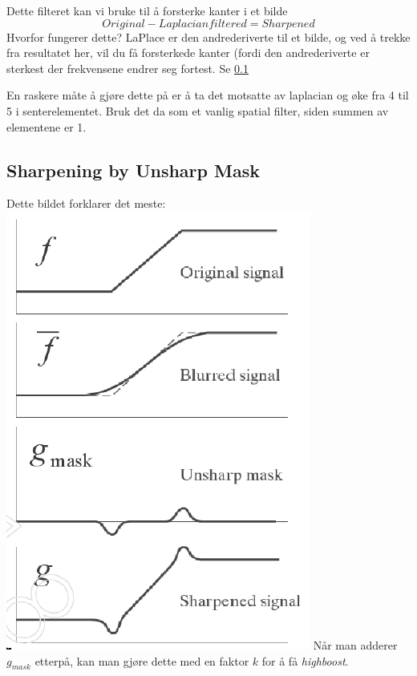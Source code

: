 Dette filteret kan vi bruke til å forsterke kanter i et bilde
\begin{equation}
    Original - Laplacian filtered = Sharpened
\end{equation}
Hvorfor fungerer dette? LaPlace er den andrederiverte til et bilde, og ved å trekke fra resultatet her, vil du få forsterkede kanter (fordi den andrederiverte er sterkest der frekvensene endrer seg fortest. Se \ref{subsection:unsharp_mask}

En raskere måte å gjøre dette på er å ta det motsatte av laplacian og øke fra 4 til 5 i senterelementet. Bruk det da som et vanlig spatial filter, siden summen av elementene er 1.

\subsection{Sharpening by Unsharp Mask}\label{subsection:unsharp_mask}
Dette bildet forklarer det meste:
\\ \includegraphics[width=\textwidth]{Bilder/unsharp_mask.png}
Når man adderer $g_{mask}$ etterpå, kan man gjøre dette med en faktor $k$ for å få \emph{highboost}.

